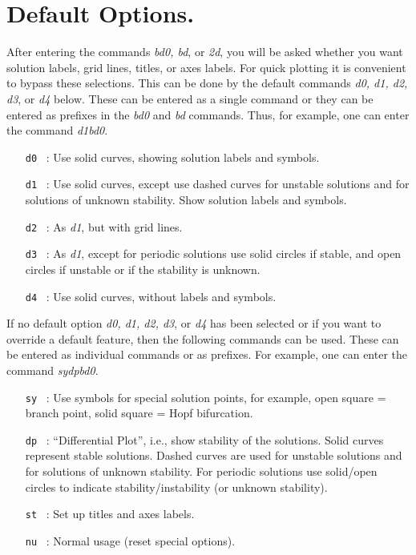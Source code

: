 \documentclass[12pt]{report}
\begin{document}
\section{ Default Options.} \label{sec:PLAUT_default}
After entering the commands {\it bd0, bd}, or {\it 2d}, you will be asked whether you 
want solution labels, grid lines, titles, or axes labels.
For quick plotting it is convenient to bypass these selections.
This can be done by the default commands {\it d0, d1, d2, d3}, or {\it d4} below.
These can be entered as a single command 
or they can be entered as prefixes in the {\it bd0} and {\it bd} commands. 
Thus, for example, one can enter the command {\it d1bd0}.  

\begin{itemize}
\item[\tt d0]~:  Use solid curves, showing solution labels and symbols.  
\item[\tt d1]~:  Use solid curves, except use dashed curves for unstable
  solutions and for solutions of unknown stability.
  Show solution labels and symbols.
\item[\tt d2]~:  As {\it d1}, but with grid lines.  
\item[\tt d3]~:  As {\it d1}, except for periodic solutions use 
  solid circles if stable,
  and open circles if unstable or if the stability
  is unknown.
\item[\tt d4]~:  Use solid curves, without labels and symbols.  
\end{itemize}

If no default option {\it d0, d1, d2, d3}, or {\it d4} has been selected 
or if you want to override a default feature,
then the following commands can be used.
These can be entered as individual commands or as prefixes.
For example, one can enter the command {\it sydpbd0}.

\begin{itemize}
\item[\tt sy]~:  Use symbols for special solution points, for example,
  open square = branch point,
  solid square = Hopf bifurcation.
\item[\tt dp]~:  ``Differential Plot'', i.e., show stability of the 
  solutions. Solid curves represent stable solutions.
  Dashed curves are used for unstable
  solutions and for solutions of unknown stability.
  For periodic solutions use solid/open circles
  to indicate stability/instability (or unknown
  stability).
\item[\tt st]~:  Set up titles and axes labels. 
\item[\tt nu]~:  Normal usage (reset special options). 
\end{itemize}
\end{document}
